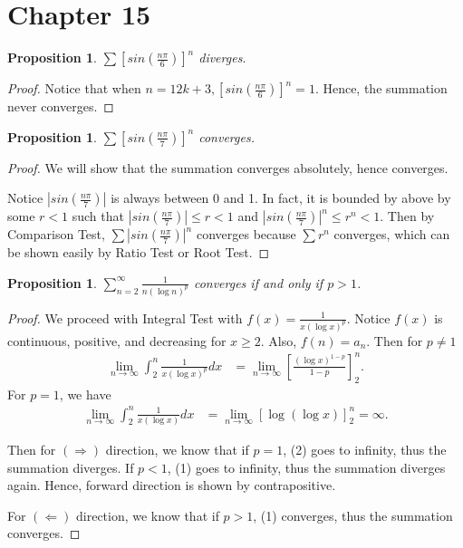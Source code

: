 \documentclass{article}
\newtheorem{proposition}[thm]{Proposition}
\begin{document}
\newpage
\section*{Chapter 15}
\begin{proposition}
    $\sum \left[sin\left(\frac{n\pi}{6}\right)\right]^n$ diverges.
\end{proposition}
\begin{proof}
    Notice that when $n = 12k + 3, \left[sin\left(\frac{n\pi}{6}\right)\right]^n = 1$. Hence, 
    the summation never converges.
\end{proof}

\begin{proposition}
    $\sum \left[sin\left(\frac{n\pi}{7}\right)\right]^n$ converges.
\end{proposition}
\begin{proof}
    We will show that the summation converges absolutely, hence converges.

    Notice $\left|sin\left(\frac{n\pi}{7}\right)\right|$ is always between 0 and 1. In fact, it is 
    bounded by above by some $r<1$ such that $\left|sin\left(\frac{n\pi}{7}\right)\right| \le r<1$
    and $\left|sin\left(\frac{n\pi}{7}\right)\right|^n \le r^n<1$. 
    Then by Comparison Test, $\sum\left|sin\left(\frac{n\pi}{7}\right)\right|^n$ converges because 
    $\sum r^n$ converges, which can be shown easily by Ratio Test or Root Test.
\end{proof}

\begin{proposition}
    $\sum_{n=2}^{\infty}\frac{1}{n(\log n)^p}$ converges if and only if $p>1$.
\end{proposition}
\begin{proof}
    We proceed with Integral Test with $f(x)=\frac{1}{x(\log x)^p}$. Notice $f(x)$ is continuous,
    positive, and decreasing for $x\ge 2$. Also, $f(n) = a_n$. Then for $p\neq 1$
    \begin{align}
        \lim_{n\to\infty}\int_{2}^{n}\frac{1}{x(\log x)^p}dx & = 
        \lim_{n\to\infty}\left[\frac{(\log x)^{1-p}}{1-p}\right]_2^n.
    \end{align}
    For $p = 1$, we have 
    \begin{align}
        \lim_{n\to\infty}\int_{2}^{n}\frac{1}{x(\log x)}dx & =
        \lim_{n\to\infty}\left[\log(\log x)\right]_2^n = \infty.
    \end{align}

    Then for $(\Rightarrow)$ direction, we know that if $p=1$, (2) goes to infinity, thus the 
    summation diverges. If $p<1$, (1) goes to infinity, thus the summation diverges again. Hence, 
    forward direction is shown by contrapositive.

    For $(\Leftarrow)$ direction, we know that if $p>1$, (1) converges, thus the summation converges.
\end{proof}
\end{document}
